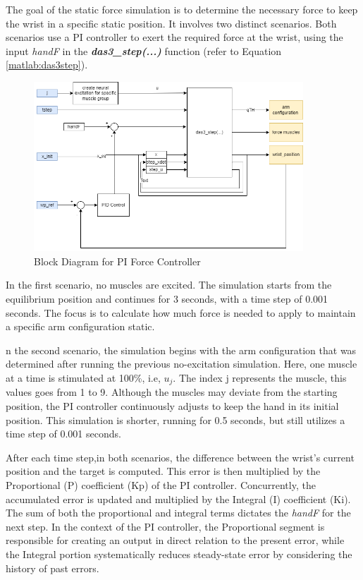  The goal of the static force simulation is to determine the necessary force to keep the wrist in a specific static position. It involves two distinct scenarios. Both scenarios use a PI controller to exert the required force at the wrist, using the input \textit{handF} in the \textbf{\textit{das3\_step(...)}} function (refer to Equation \ref{matlab:das3step}).

\begin{figure}[h!]
    \centering
    \includegraphics[width=0.9\textwidth]{Pictures/Model/PIController.png}
    \caption{Block Diagram for PI Force Controller}
    \label{fig:PIBlockDiagram}
\end{figure}

In the first scenario, no muscles are excited. The simulation starts from the equilibrium position and continues for 3 seconds, with a time step of 0.001 seconds. The focus is to calculate how much force is needed to apply to maintain a specific arm configuration static.

n the second scenario, the simulation begins with the arm configuration that was determined after running the previous no-excitation simulation. Here, one muscle at a time is stimulated at 100\%, i.e, $u_{j}$. The index j represents the muscle, this values goes from 1 to 9. Although the muscles may deviate from the starting position, the PI controller continuously adjusts to keep the hand in its initial position. This simulation is shorter, running for 0.5 seconds, but still utilizes a time step of 0.001 seconds.

After each time step,in both scenarios, the difference between the wrist's current position and the target is computed. This error is then multiplied by the Proportional (P) coefficient (Kp) of the PI controller. Concurrently, the accumulated error is updated and multiplied by the Integral (I) coefficient (Ki).  The sum of both the proportional and integral terms dictates the \textit{handF} for the next step. In the context of the PI controller, the Proportional segment is responsible for creating an output in direct relation to the present error, while the Integral portion systematically reduces  steady-state error by considering the history of past errors.

